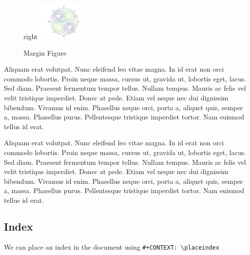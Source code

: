 \documentclass[11pt]{article}
\begin{document}
\begin{enumerate}
\begin{figure}right
\centering
\includegraphics[width=1in]{./bessel11.pdf}
\caption{Margin Figure}
\end{figure}

Aliquam erat volutpat. Nunc eleifend leo vitae magna. In id erat non orci
commodo lobortis. Proin neque massa, cursus ut, gravida ut, lobortis eget,
lacus. Sed diam. Praesent fermentum tempor tellus. Nullam tempus. Mauris ac
felis vel velit tristique imperdiet. Donec at pede. Etiam vel neque nec dui
dignissim bibendum. Vivamus id enim. Phasellus neque orci, porta a, aliquet
quis, semper a, massa. Phasellus purus. Pellentesque tristique imperdiet
tortor. Nam euismod tellus id erat.

Aliquam erat volutpat. Nunc eleifend leo vitae magna. In id erat non orci
commodo lobortis. Proin neque massa, cursus ut, gravida ut, lobortis eget,
lacus. Sed diam. Praesent fermentum tempor tellus. Nullam tempus. Mauris ac
felis vel velit tristique imperdiet. Donec at pede. Etiam vel neque nec dui
dignissim bibendum. Vivamus id enim. Phasellus neque orci, porta a, aliquet
quis, semper a, massa. Phasellus purus. Pellentesque tristique imperdiet tortor.
Nam euismod tellus id erat.
\end{enumerate}

\subsection{Index}
\label{sec:orge2757c8}
We can place an index in the document using \texttt{\#+CONTEXT: \textbackslash{}placeindex}
\end{document}
